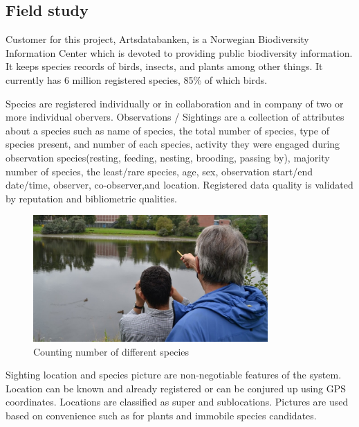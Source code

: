 \subsection{Field study}

Customer for this project, Artsdatabanken, is a Norwegian  Biodiversity Information Center which is devoted to providing public biodiversity information. It keeps species records of birds, insects, and plants among other things. It currently has 6 million registered species, 85\% of which birds\cite{arts:field-study}. \newline

Species are registered individually or in collaboration and in company of two or more individual obervers. Observations / Sightings are a collection of attributes about a species such as name of species, the total number of species, type of species present, and number of each species, activity they were engaged during observation species(resting, feeding, nesting, brooding, passing by), majority number of species, the least/rare species, age, sex, observation start/end date/time, observer, co-observer,and location. Registered data quality is validated by reputation and bibliometric qualities.\newline

\begin{figure}[htb]
	\centering
	\includegraphics[width=0.8\textwidth]{prestudy/field_study/field_stud.jpg}
	\caption{Counting number of different species}
	\label{fig:field_study}
\end{figure}

Sighting location and species picture are non-negotiable features of the system. Location can be known and already registered or can be conjured up using GPS coordinates. Locations are classified as super and sublocations. Pictures are used based on convenience such as for plants and immobile species candidates.\newline

